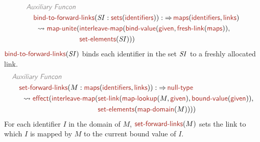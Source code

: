 \documentclass[fleqn]{article}
\newcommand{\KEY}[1]{\textsf{\textit{\color{Gray}#1}}}
\newcommand{\VAR}[1]{\mathit{\small#1}}
\newcommand{\NAME}[2][\PLAIN]{#1{Name_#2}{\textsf{\color{Mahogany}#2}}}
\newcommand{\PLAIN}[1]{}
\newcommand{\TO}{\mathop{\Rightarrow}}
\begin{document}
% 
\begin{align*}
  & \KEY{Auxiliary Funcon} ~
\\
  & \quad \NAME{bind-to-forward-links}(\VAR{SI}:\NAME{sets}(\NAME{identifiers})) : \TO \NAME{maps}(\NAME{identifiers}, \NAME{links})
\\
  & \quad ~ {} \leadsto \NAME{map-unite}(
    \begin{aligned}[t]
    & \NAME{interleave-map}(\NAME{bind-value}(\NAME{given}, \NAME{fresh-link}(\NAME{maps})),
    \\
    & \NAME{set-elements}(\VAR{SI})))
    \end{aligned}
\end{align*}
% 
$ \NAME{bind-to-forward-links}(\VAR{SI}) $ binds each identifier in the set $ \VAR{SI} $ to a
freshly allocated link.
% 
\begin{align*}
  & \KEY{Auxiliary Funcon} ~
\\
  & \quad \NAME{set-forward-links}(M:\NAME{maps}(\NAME{identifiers}, \NAME{links})) : \TO \NAME{null-type}
\\
  & \quad ~ {} \leadsto \NAME{effect}(\NAME{interleave-map}(
    \begin{aligned}[t]
    & \NAME{set-link}(\NAME{map-lookup}(M, \NAME{given}), \NAME{bound-value}(\NAME{given})),
    \\
    & \NAME{set-elements}(\NAME{map-domain}(M))))
    \end{aligned}
\end{align*}
% 
For each identifier $ I $ in the domain of $ M $, $ \NAME{set-forward-links}(M) $ sets the 
link to which $ I $ is mapped by $ M $ to the current bound value of $ I $.
\end{document}
